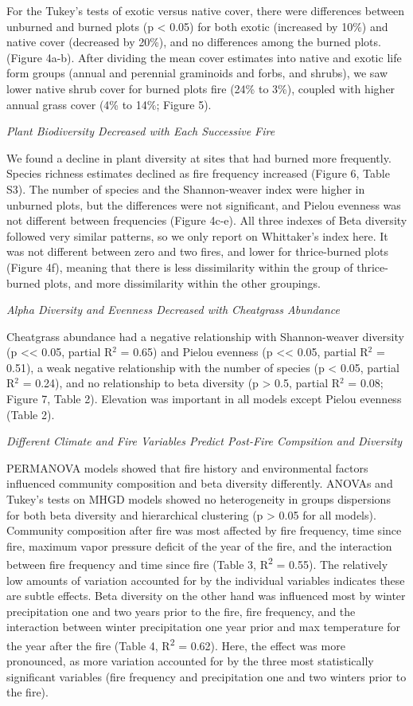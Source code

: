 \documentclass[12pt,]{article}
\begin{document}
For the Tukey's tests of exotic versus native cover, there were
differences between unburned and burned plots (p \textless{} 0.05) for
both exotic (increased by 10\%) and native cover (decreased by 20\%),
and no differences among the burned plots. (Figure 4a-b). After dividing
the mean cover estimates into native and exotic life form groups (annual
and perennial graminoids and forbs, and shrubs), we saw lower native
shrub cover for burned plots fire (24\% to 3\%), coupled with higher
annual grass cover (4\% to 14\%; Figure 5).

\emph{Plant Biodiversity Decreased with Each Successive Fire}

We found a decline in plant diversity at sites that had burned more
frequently. Species richness estimates declined as fire frequency
increased (Figure 6, Table S3). The number of species and the
Shannon-weaver index were higher in unburned plots, but the differences
were not significant, and Pielou evenness was not different between
frequencies (Figure 4c-e). All three indexes of Beta diversity followed
very similar patterns, so we only report on Whittaker's index here. It
was not different between zero and two fires, and lower for
thrice-burned plots (Figure 4f), meaning that there is less
dissimilarity within the group of thrice-burned plots, and more
dissimilarity within the other groupings.

\emph{Alpha Diversity and Evenness Decreased with Cheatgrass Abundance}

Cheatgrass abundance had a negative relationship with Shannon-weaver
diversity (p \textless{}\textless{} 0.05, partial R\(^2\) = 0.65) and
Pielou evenness (p \textless{}\textless{} 0.05, partial R\(^2\) = 0.51),
a weak negative relationship with the number of species (p \textless{}
0.05, partial R\(^2\) = 0.24), and no relationship to beta diversity (p
\textgreater{} 0.5, partial R\(^2\) = 0.08; Figure 7, Table 2).
Elevation was important in all models except Pielou evenness (Table 2).

\emph{Different Climate and Fire Variables Predict Post-Fire Compsition
and Diversity}

PERMANOVA models showed that fire history and environmental factors
influenced community composition and beta diversity differently. ANOVAs
and Tukey's tests on MHGD models showed no heterogeneity in groups
dispersions for both beta diversity and hierarchical clustering (p
\textgreater{} 0.05 for all models). Community composition after fire
was most affected by fire frequency, time since fire, maximum vapor
pressure deficit of the year of the fire, and the interaction between
fire frequency and time since fire (Table 3, R\textsuperscript{2} =
0.55). The relatively low amounts of variation accounted for by the
individual variables indicates these are subtle effects. Beta diversity
on the other hand was influenced most by winter precipitation one and
two years prior to the fire, fire frequency, and the interaction between
winter precipitation one year prior and max temperature for the year
after the fire (Table 4, R\textsuperscript{2} = 0.62). Here, the effect
was more pronounced, as more variation accounted for by the three most
statistically significant variables (fire frequency and precipitation
one and two winters prior to the fire).
\end{document}

